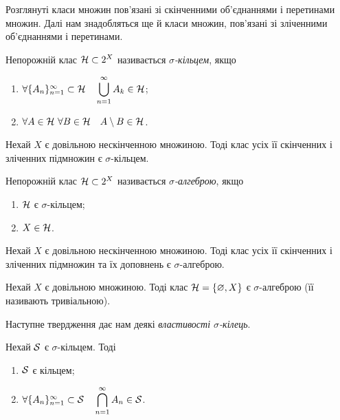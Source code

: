 Розглянуті класи множин пов'язані зі скінченними об'єднаннями і перетинами множин. Далі нам знадобляться ще й класи множин, пов'язані зі зліченними об'єднаннями і перетинами.

\begin{definition}
	\label{def-1-4}
	Непорожній клас $\mathcal H\subset 2^X$ називається \emph{$\sigma$-кільцем}, якщо
	\begin{enumerate}[label={\upshape (\roman*)}]
		\item \label{def-1-4-i}
		$\forall \{A_n\}_{n=1}^\infty\subset\mathcal H\quad
		\displaystyle  \bigcup_{n=1}^\infty A_k\in\mathcal H $;
		\item \label{def-1-4-ii}
		$\forall A\in\mathcal H\ \forall B\in\mathcal H\quad A\setminus B\in\mathcal H $.
	\end{enumerate}
\end{definition}

\begin{example}
	\label{ex-1-6}
	Нехай $X$ є довільною нескінченною множиною. Тоді клас усіх її скінченних і зліченних підмножин  є  $\sigma$-кільцем.
\end{example}

\begin{definition}
	\label{def-1-5}
	Непорожній клас $\mathcal H\subset 2^X$  називається \emph{$\sigma$-ал\-геб\-рою}, якщо
	\begin{enumerate}[label={\upshape (\roman*)}]
		\item \label{def-1-5-i}
		$\mathcal H $ є $\sigma$-кільцем;
		\item \label{def-1-5-ii}
		$X\in\mathcal H $.
	\end{enumerate}
\end{definition}

\begin{example}
	\label{ex-1-7}
	Нехай $X$ є довільною нескінченною множиною. Тоді клас усіх її скінченних і зліченних підмножин  та їх доповнень є  $\sigma$-алгеброю.
\end{example}

\begin{example}
	\label{ex-1-8}
	Нехай $X$ є довільною  множиною. Тоді клас $\mathcal H=\{\varnothing, X\}$ є  $\sigma$-алгеброю (її називають тривіальною).
\end{example}

Наступне твердження дає нам деякі \emph{властивості $\sigma$-кілець}.

\begin{statement}
	\label{st-pr-sring}
	Нехай $\mathcal S$ є $\sigma$-кільцем. Тоді
	\begin{enumerate}
		\item \label{st-pr-sring-1}
		$\mathcal S$ є кільцем;
		\item \label{st-pr-sring-2}
		$\forall \{A_n\}_{n=1}^\infty\subset\mathcal S \quad 
		\displaystyle  \bigcap_{n=1}^\infty A_n\in\mathcal S$.
	\end{enumerate}
\end{statement}

